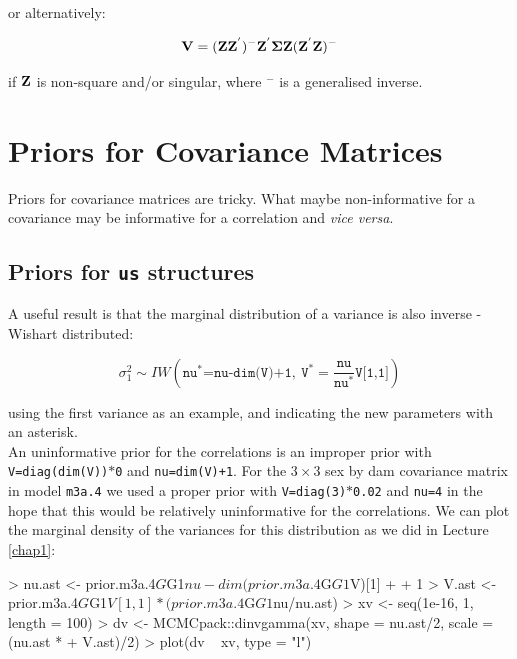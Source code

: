 \documentclass{article}
\begin{document}
or alternatively: 

\begin{equation}
{\bf V} = ({\bf Z}{\bf Z}^{'})^{-}{\bf Z}^{'}{\bm \Sigma}{\bf Z}({\bf Z}^{'}{\bf Z})^{-}
\end{equation}

if ${\bf Z}$ is non-square and/or singular, where \texttt{$^{-}$} is a generalised inverse.\\

 
\section{Priors for  Covariance Matrices}
\label{VCVprior-sec}

Priors for covariance matrices are tricky. What maybe non-informative for a covariance may be informative for a correlation and \emph{vice versa}.

\subsection{Priors for \texttt{us} structures}

 A useful result is that the marginal distribution of a variance is also inverse - Wishart distributed:

\begin{displaymath}
\sigma^{2}_{1} \sim IW\left(\texttt{nu}^{\ast}\texttt{=nu-dim(V)+1},\ \texttt{V}^{\ast}=\frac{\texttt{nu}}{\texttt{nu}^{\ast}}\texttt{V[1,1]}\right)
\end{displaymath}

using the first variance as an example, and indicating the new parameters with an asterisk.\\

An uninformative prior for the correlations is an improper prior with \texttt{V=diag(dim(V))$\ast$0} and \texttt{nu=dim(V)+1}. For the $3\times3$ sex by dam covariance matrix in model \texttt{m3a.4} we used a proper prior with \texttt{V=diag(3)$\ast$0.02} and \texttt{nu=4} in the hope that this would be relatively uninformative for the correlations. We can plot the marginal density of the variances for this distribution as we did in Lecture \ref{chap1}:

\begin{Schunk}
\begin{Sinput}
> nu.ast <- prior.m3a.4$G$G1$nu - dim(prior.m3a.4$G$G1$V)[1] + 
+     1
> V.ast <- prior.m3a.4$G$G1$V[1, 1] * (prior.m3a.4$G$G1$nu/nu.ast)
> xv <- seq(1e-16, 1, length = 100)
> dv <- MCMCpack::dinvgamma(xv, shape = nu.ast/2, scale = (nu.ast * 
+     V.ast)/2)
> plot(dv ~ xv, type = "l")
\end{Sinput}
\end{Schunk}
\end{document}
